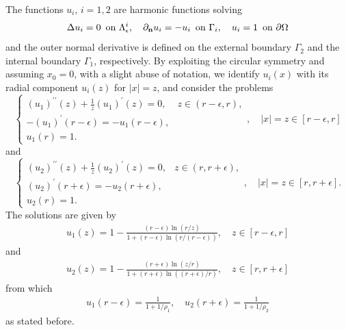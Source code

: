 \documentclass[10pt,a4paper]{article}
\numberwithin{equation}{section}
\theoremstyle{plain}
\theoremstyle{remark}
\begin{document}
The functions $u_i$, $i=1,2$ are harmonic functions solving
\begin{align*}
\Delta u_i =0\, \textrm{ on } \Lambda_\epsilon^i,\quad  \partial_{\bf n} u_i = - u_i\, \textrm{ on }  \Gamma_i, \quad u_i=1\, \textrm{ on }  \partial \Omega
\end{align*}
and the outer normal derivative is defined on the external boundary $\Gamma_2$ and the internal boundary $\Gamma_1$, respectively. By exploiting the circular symmetry and assuming $x_0=0$, with a slight abuse of notation, we identify $u_i(x)$ with its radial component $u_i(z)$ for $|x|=z$, and consider the problems 
\begin{equation*}
\left\lbrace
\begin{array}{ll}
(u_1)^{\prime \prime}(z) + \frac{1}{z} (u_1)^\prime(z) = 0, & z \in (r-\epsilon, r),\\
-(u_1)^\prime(r-\epsilon) = -u_1(r-\epsilon),\\
u_1(r)=1.
\end{array}
\right . , \quad |x| = z \in [r-\epsilon, r]
\end{equation*}
and
\begin{equation*}
\left\lbrace
\begin{array}{ll}
(u_2)^{\prime \prime}(z) + \frac{1}{z} (u_2)^\prime(z) = 0, & z \in (r,r+\epsilon),\\
(u_2)^\prime(r+\epsilon) = -u_2(r+\epsilon),\\
u_2(r) = 1.
\end{array}
\right . , \quad |x|=z \in [r, r+\epsilon].
\end{equation*}
The solutions are given by
\begin{align*}
u_1(z) = 1 - \frac{(r-\epsilon) \ln (r/z)}{1 + (r-\epsilon) \ln(r/(r-\epsilon))}, \quad z \in [r-\epsilon, r]
\end{align*}
and
\begin{align*}
u_2(z) = 1 - \frac{(r+\epsilon) \ln(z/r)}{1 + (r+\epsilon) \ln((r+\epsilon)/r)}, \quad z \in [r, r+\epsilon]
\end{align*}
from which
\begin{align*}
u_1(r-\epsilon) = \frac{1}{1 + 1/\rho_1}, \quad u_2(r+\epsilon) = \frac{1}{1 + 1/\rho_2}
\end{align*}
as stated before.\\
\end{document}
